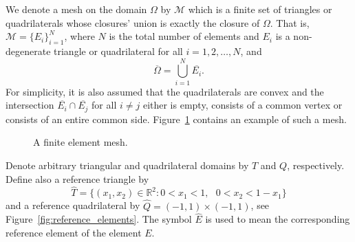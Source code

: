 \documentclass[english, 12pt, a4paper, sci, utf8, a-2b, online]{aaltothesis}
\theoremstyle{definition}
\theoremstyle{plain}
\numberwithin{equation}{section}
\begin{document}
We denote a mesh on the domain $\Omega$ by $\mathcal{M}$
which is a finite set of triangles or quadrilaterals
whose closures' union is exactly the closure of $\Omega$.
That is, $\mathcal{M} = \{ E_i \}_{i=1}^{N}$, where
$N$ is the total number of elements and
$E_i$ is a non-degenerate triangle or quadrilateral for all $i=1,2,\dotsc,N$, and
\begin{equation*}
    \overline{\Omega} = \bigcup_{i=1}^{N} \overline{E_i}.
\end{equation*}
For simplicity, it is also assumed that the quadrilaterals are convex and the intersection
$\overline{E_i} \cap \overline{E_j}$ for all $i \neq j$
either is empty, consists of a common vertex or consists of an entire common side.
Figure~\ref{fig:example_mesh} contains an example of such a mesh.
\begin{figure}[t]
    \centering
    \caption{A finite element mesh.}
    \label{fig:example_mesh}
\end{figure}

Denote arbitrary triangular and quadrilateral domains by $T$ and $Q$,
respectively. Define also a reference triangle by
\begin{equation*}
    \widehat{T} = \{ (x_1,x_2) \in \mathbb{R}^2 : 
        0 < x_1 < 1,\text{ } 0 < x_2 < 1 - x_1 \}
\end{equation*}
and a reference quadrilateral by $\widehat{Q} = (-1,1) \times (-1,1)$,
see Figure~\ref{fig:reference_elements}.
The symbol $\widehat{E}$ is used to mean the corresponding reference element
of the element $E$.
\end{document}
